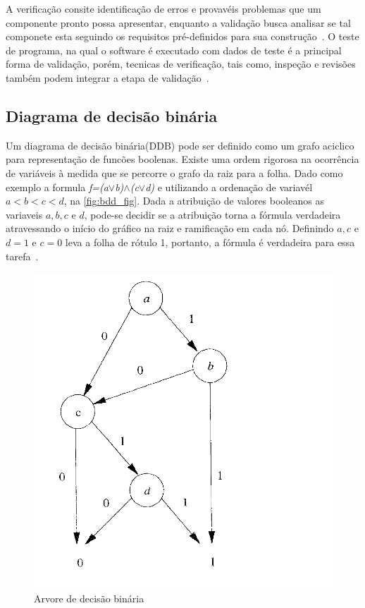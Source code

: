 \par
A verificação consite identificação de erros e provavéis problemas que um componente pronto possa apresentar, enquanto a validação busca analisar se tal componete esta seguindo os requisitos pré-definidos para sua construção~\cite{koscianski2007qualidade}. O teste de programa, na qual o software  é executado com dados de teste é a principal forma de validação, porém, tecnicas de verificação, tais como, inspeção e revisões também podem integrar a etapa de validação~\cite{sommerville2011engenharia}.

\subsection{Diagrama de decisão binária}
Um diagrama de decisão binária(DDB) pode ser definido como um grafo aciclico para representação de funcões boolenas. Existe uma ordem rigorosa na ocorrência de variáveis à medida que se percorre o grafo da raiz para a folha. Dado como exemplo a formula \textit{f=(a$\lor$b)$\land$(c$\lor$d)} e utilizando a ordenação de variavél $a < b < c < d$, na \autoref{fig:bdd_fig}. Dada a atribuição de valores booleanos as variaveis $a, b, c$ e $d$, pode-se decidir se a atribuição torna a fórmula verdadeira atravessando o início do gráfico na raiz e ramificação em cada nó. Definindo $a,c$ e $d = 1$ e $c = 0$ leva a folha de rótulo 1, portanto, a fórmula é verdadeira para essa tarefa~\cite{clarke1994model}.

\begin{figure}[htb]
	\begin{center}
    \caption{\label{fig:bdd_fig}Arvore de decisão binária}
	\includegraphics[scale=0.30]{Figuras/Arvore_BDD.png}
	\end{center}
\end{figure}

